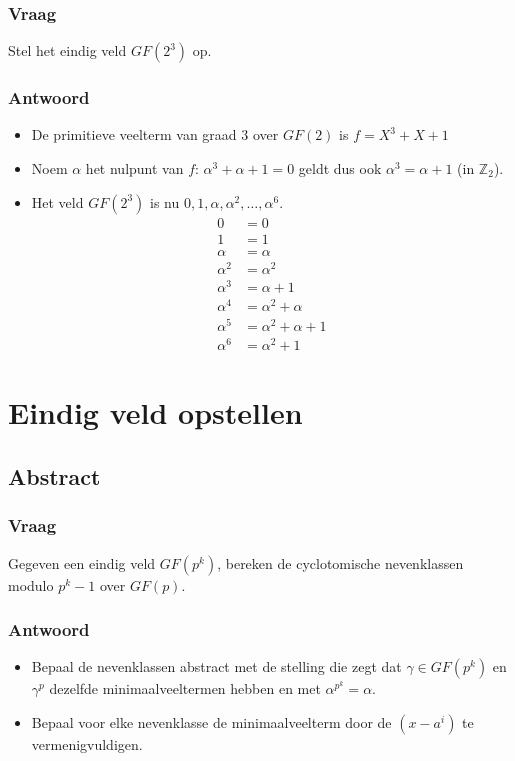 \documentclass[main.tex]{subfiles}
\begin{document}
\subsubsection*{Vraag}
Stel het eindig veld $GF(2^{3})$ op.

\subsubsection*{Antwoord}
\begin{itemize}
\item De primitieve veelterm van graad $3$ over $GF(2)$ is $f=X^{3}+X+1$
\item Noem $\alpha$ het nulpunt van $f$: $\alpha^{3} + \alpha + 1=0$ geldt dus ook $\alpha^{3} = \alpha + 1$ (in $\mathbb{Z}_{2}$).
\item Het veld $GF(2^{3})$ is nu $0,1,\alpha,\alpha^{2},\dotsc,\alpha^{6}$.
  \[
  \begin{array}{rl}
    0 &= 0\\
    1 &= 1\\
    \alpha &= \alpha\\
    \alpha^{2} &= \alpha^{2}\\
    \alpha^{3} &= \alpha + 1\\
    \alpha^{4} &= \alpha^{2} + \alpha\\
    \alpha^{5} &= \alpha^{2} + \alpha + 1\\
    \alpha^{6} &= \alpha^{2} + 1
  \end{array}
  \]
\end{itemize}

\newpage
\section{Eindig veld opstellen}
\subsection*{Abstract}
\subsubsection*{Vraag}
Gegeven een eindig veld $GF(p^{k})$, bereken de cyclotomische nevenklassen modulo $p^{k}-1$ over $GF(p)$.
\subsubsection*{Antwoord}
\begin{itemize}
\item Bepaal de nevenklassen abstract met de stelling die zegt dat $\gamma\in GF(p^{k})$ en $\gamma^{p}$ dezelfde minimaalveeltermen hebben en met $\alpha^{p^{k}} = \alpha$.
\item Bepaal voor elke nevenklasse de minimaalveelterm door de $(x-a^{i})$ te vermenigvuldigen.
\end{itemize}
\end{document}
